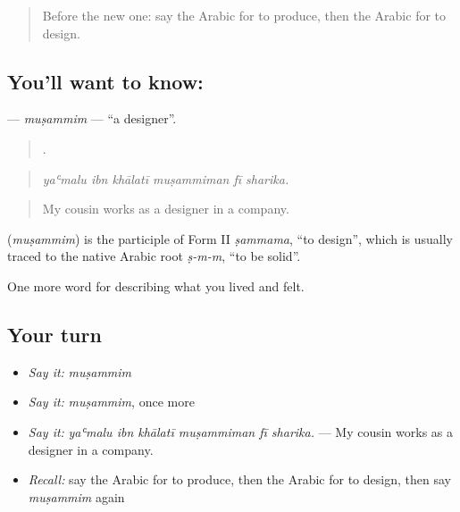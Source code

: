 \label{lesson:AR-C525-musammim}



\begin{quote}
Before the new one: say the Arabic for to produce, then the Arabic for to design.
\end{quote}

\subsection*{You'll want to know: }
\textbf{} — \emph{muṣammim} — \textquotedblleft{}a designer\textquotedblright{}.

\begin{quote}
     .
\end{quote}

\begin{quote}
\emph{yaʿmalu ibn khālatī muṣammiman fī sharika.}
\end{quote}

\begin{quote}
My cousin works as a designer in a company.
\end{quote}

\begin{cousinweb}
\textbf{} (\emph{muṣammim}) is the participle of Form II \emph{ṣammama}, \textquotedblleft{}to design\textquotedblright{}, which is usually traced to the native Arabic root \emph{ṣ-m-m}, \textquotedblleft{}to be solid\textquotedblright{}.
\end{cousinweb}

\begin{grammarlens}[title={What you've built}]
One more word for describing what you lived and felt.
\end{grammarlens}

\subsection*{Your turn}
\begin{itemize}
\raggedright
  \item \emph{Say it:} \emph{muṣammim}
  \item \emph{Say it:} \emph{muṣammim}, once more
  \item \emph{Say it:} \emph{yaʿmalu ibn khālatī muṣammiman fī sharika.} — My cousin works as a designer in a company.
  \item \emph{Recall:} say the Arabic for to produce, then the Arabic for to design, then say \emph{muṣammim} again
\end{itemize}

